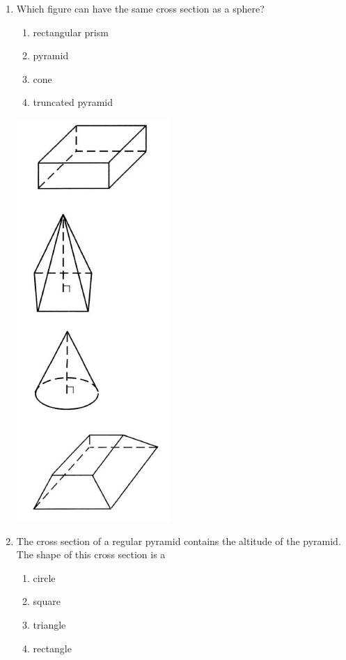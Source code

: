 \documentclass[12pt, twoside]{article}
\begin{document}
\begin{enumerate}
\newpage
  \item Which figure can have the same cross section as a sphere?
    \begin{multicols}{2}
      \begin{enumerate}
        \item rectangular prism
        \item pyramid
        \item cone
        \item truncated pyramid
      \end{enumerate}
    \includegraphics[scale=0.5]{solids2.png}
    \end{multicols}

  \item The cross section of a regular pyramid contains the altitude of the pyramid. The shape of this cross section is a
    \begin{multicols}{2}
      \begin{enumerate}
        \item circle
        \item square
        \item triangle
        \item rectangle
      \end{enumerate}
    \end{multicols}


\end{enumerate}
\end{document}
